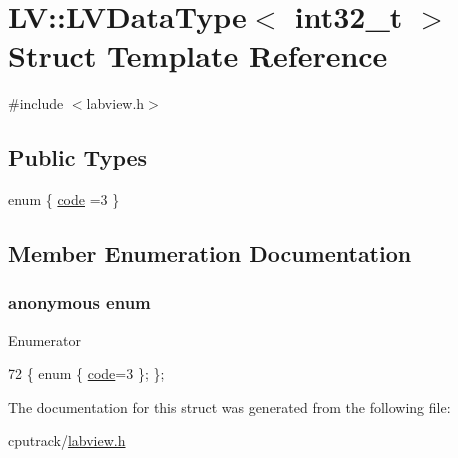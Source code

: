 \hypertarget{struct_l_v_1_1_l_v_data_type_3_01int32__t_01_4}{}\section{LV\+:\+:L\+V\+Data\+Type$<$ int32\+\_\+t $>$ Struct Template Reference}
\label{struct_l_v_1_1_l_v_data_type_3_01int32__t_01_4}


{\ttfamily \#include $<$labview.\+h$>$}

\subsection*{Public Types}
\begin{DoxyCompactItemize}
\item 
enum \{ \hyperlink{struct_l_v_1_1_l_v_data_type_3_01int32__t_01_4_a6823a8fc494896d243cf06cb0e6ada9dad98e8ec3a4d678429b463e37a527e580}{code} =3
 \}
\end{DoxyCompactItemize}


\subsection{Member Enumeration Documentation}
\subsubsection[{\texorpdfstring{anonymous enum}{anonymous enum}}]{\setlength{\rightskip}{0pt plus 5cm}anonymous enum}\hypertarget{struct_l_v_1_1_l_v_data_type_3_01int32__t_01_4_a6823a8fc494896d243cf06cb0e6ada9d}{}\label{struct_l_v_1_1_l_v_data_type_3_01int32__t_01_4_a6823a8fc494896d243cf06cb0e6ada9d}
\begin{Desc}
\item[Enumerator]\par
\begin{description}
\item[{\em 
code\hypertarget{struct_l_v_1_1_l_v_data_type_3_01int32__t_01_4_a6823a8fc494896d243cf06cb0e6ada9dad98e8ec3a4d678429b463e37a527e580}{}\label{struct_l_v_1_1_l_v_data_type_3_01int32__t_01_4_a6823a8fc494896d243cf06cb0e6ada9dad98e8ec3a4d678429b463e37a527e580}
}]\end{description}
\end{Desc}

\begin{DoxyCode}
72 \{ \textcolor{keyword}{enum} \{ \hyperlink{struct_l_v_1_1_l_v_data_type_3_01int32__t_01_4_a6823a8fc494896d243cf06cb0e6ada9dad98e8ec3a4d678429b463e37a527e580}{code}=3 \}; \};
\end{DoxyCode}


The documentation for this struct was generated from the following file\+:\begin{DoxyCompactItemize}
\item 
cputrack/\hyperlink{labview_8h}{labview.\+h}\end{DoxyCompactItemize}

